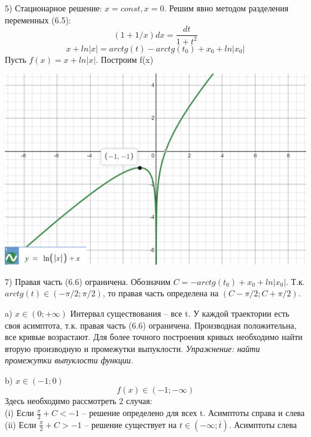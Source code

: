 \documentclass[10pt]{report}
\begin{document}
5) Стационарное решение: $x = const, x = 0$. Решим явно методом разделения переменных (6.5):
\[ (1+1/x)dx=\frac {dt} {1+t^2}\]
\begin{equation}
x+ln|x| = arctg(t)-arctg(t_0)+x_0+ln|x_0|
\end{equation}
Пусть $f(x) = x+ln|x|$. Построим f(x) 
\begin{center}
{\includegraphics[scale=0.4]{graph6.3.png}} 
\end{center}
7) Правая часть (6.6) ограничена. Обозначим $C  = -arctg(t_0)+x_0+ln|x_0|$. Т.к. $arctg(t) \in(-\pi/2; \pi/2)$, то правая часть определена на $(C-\pi/2; C+\pi/2). $

a) $x \in (0; +\infty)$
Интервал существования -- все t. У каждой траектории есть своя асимптота, т.к. правая часть (6.6) ограничена. Производная положительна, все кривые возрастают. Для более точного построения кривых необходимо найти вторую производную и промежутки выпуклости.
\textit{Упражнение: найти промежутки выпуклости функции.}

b) $x \in (-1; 0)$
\[ f(x) \in (-1; -\infty)\]
Здесь необходимо рассмотреть 2 случая:\\
(i) Если $ \frac \pi 2 + C < -1 $ -- решение определено для всех t. Асимптоты справа и слева\\
(ii) Если   $ \frac \pi 2 + C > -1 $ -- решение существует на $ t \in (-\infty; \overline{t})$.  Асимптоты слева
\end{document}
